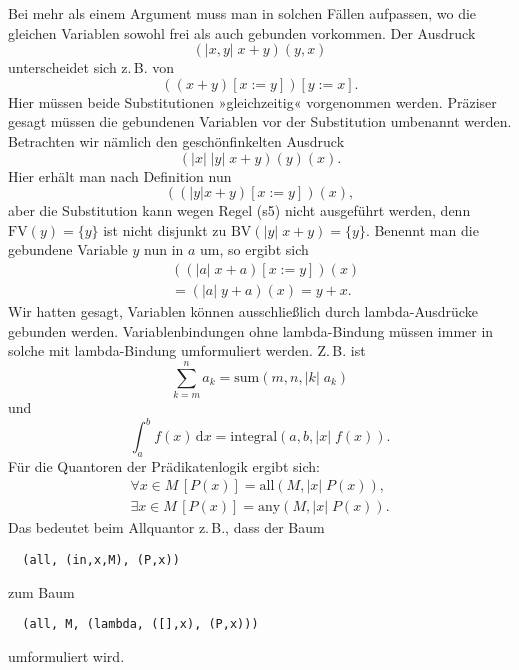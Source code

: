 \documentclass[a4paper,11pt,fleqn,twocolumn,twoside]{article}
\numberwithin{equation}{section}
\begin{document}
Bei mehr als einem Argument muss man in solchen Fällen aufpassen,
wo die gleichen Variablen sowohl frei als auch gebunden vorkommen.
Der Ausdruck
\begin{equation}
(|x,y|\; x+y)(y,x)
\end{equation}
unterscheidet sich z.\,B. von
\begin{equation}
((x+y)[x:=y])[y:=x].
\end{equation}
Hier müssen beide Substitutionen »gleichzeitig« vorgenommen werden.
Präziser gesagt müssen die gebundenen Variablen vor der Substitution
umbenannt werden. Betrachten wir nämlich den geschönfinkelten
Ausdruck
\begin{equation}
(|x|\;|y|\;x+y)(y)(x).
\end{equation}
Hier erhält man nach Definition nun
\begin{equation}
((|y| x+y)[x:=y])(x),
\end{equation}
aber die Substitution kann wegen Regel (s5) nicht ausgeführt
werden, denn $\mathrm{FV}(y)=\{y\}$ ist nicht disjunkt zu
$\mathrm{BV}(|y|\;x+y)=\{y\}$. Benennt man die gebundene Variable
$y$ nun in $a$ um, so ergibt sich
\begin{equation}
\begin{split}
&((|a|\;x+a)[x:=y])(x)\\
&= (|a|\;y+a)(x) = y+x.
\end{split}
\end{equation}
Wir hatten gesagt, Variablen können ausschließlich durch
lambda-Ausdrücke gebunden werden. Variablenbindungen ohne
lambda-Bindung müssen immer in solche mit lambda-Bindung umformuliert
werden. Z.\,B. ist
\begin{equation}
\sum_{k=m}^n a_k = \mathrm{sum}(m,n,|k|\;a_k)
\end{equation}
und
\begin{equation}
\int_a^b f(x)\,\mathrm dx = \mathrm{integral}(a,b,|x|\;f(x)).
\end{equation}
Für die Quantoren der Prädikatenlogik ergibt sich:
\begin{gather}
\forall x{\in}M\,[P(x)] = \mathrm{all}(M,|x|\;P(x)),\\
\exists x{\in}M\,[P(x)] = \mathrm{any}(M,|x|\;P(x)).
\end{gather}
Das bedeutet beim Allquantor z.\,B., dass der Baum
\begin{verbatim}
  (all, (in,x,M), (P,x))
\end{verbatim}
zum Baum
\begin{verbatim}
  (all, M, (lambda, ([],x), (P,x)))
\end{verbatim}
umformuliert wird.
\end{document}
